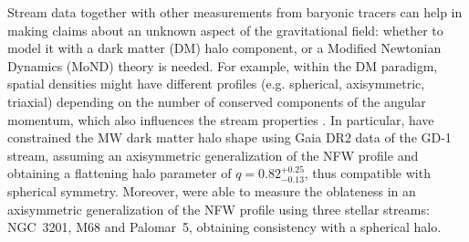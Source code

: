 \documentclass[twocolumn]{aa}
\begin{document}
Stream data together with other measurements from baryonic tracers can help in making claims about an unknown aspect of the gravitational field: whether to model it with a dark matter (DM) halo component, or a Modified Newtonian Dynamics (MoND) theory is needed.
For example, within the DM paradigm, spatial densities might have different profiles
(e.g. spherical, axisymmetric, triaxial) depending on the number of conserved components of the angular momentum, which also influences the stream properties \citep{2013ApJ...773L...4V,2016MNRAS.455.1079P,2020MNRAS.492.4398M}.
In particular, \citet{2019MNRAS.486.2995M} have constrained the MW dark matter halo shape using Gaia DR2 data of the GD-1 stream, assuming an axisymmetric generalization of the NFW profile and obtaining a flattening halo parameter of $q=0.82^{+0.25}_{-0.13}$, thus compatible with spherical symmetry.
Moreover, \cite{2023MNRAS.524.2124P} were able to measure the oblateness in an axisymmetric generalization of the NFW profile using three stellar streams: NGC~3201, M68 and Palomar~5, obtaining
consistency with a spherical halo.
\end{document}
